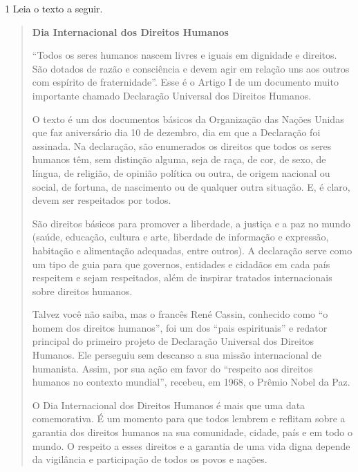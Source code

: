 
\num{1} Leia o texto a seguir.


\begin{quote}
\textbf{Dia Internacional dos Direitos Humanos}


``Todos os seres humanos nascem livres e iguais em dignidade e
direitos. São dotados de razão e consciência e devem agir em relação
uns aos outros com espírito de fraternidade''. Esse é o Artigo I de um
documento muito importante chamado Declaração Universal dos Direitos
Humanos.

O texto é um dos documentos básicos da Organização das Nações Unidas que
faz aniversário dia 10 de dezembro, dia em que a Declaração foi
assinada. Na declaração, são enumerados os direitos que todos os seres
humanos têm, sem distinção alguma, seja de raça, de cor, de sexo, de
língua, de religião, de opinião política ou outra, de origem nacional ou
social, de fortuna, de nascimento ou de qualquer outra situação. E, é
claro, devem ser respeitados por todos.

São direitos básicos para promover a liberdade, a justiça e a paz no
mundo (saúde, educação, cultura e arte, liberdade de informação e
expressão, habitação e alimentação adequadas, entre outros). A
declaração serve como um tipo de guia para que governos, entidades e
cidadãos em cada país respeitem e sejam respeitados, além de inspirar
tratados internacionais sobre direitos humanos.

Talvez você não saiba, mas o francês René Cassin, conhecido como ``o
homem dos direitos humanos'', foi um dos ``pais espirituais'' e redator
principal do primeiro projeto de Declaração Universal dos Direitos
Humanos. Ele perseguiu sem descanso a sua missão internacional de
humanista. Assim, por sua ação em favor do ``respeito aos direitos
humanos no contexto mundial'', recebeu, em 1968, o Prêmio Nobel da Paz.

O Dia Internacional dos Direitos Humanos é mais que uma data
comemorativa. É um momento para que todos lembrem e reflitam sobre a
garantia dos direitos humanos na sua comunidade, cidade, país e em todo
o mundo. O respeito a esses direitos e a garantia de uma vida digna
depende da vigilância e participação de todos os povos e nações.


\end{quote}
